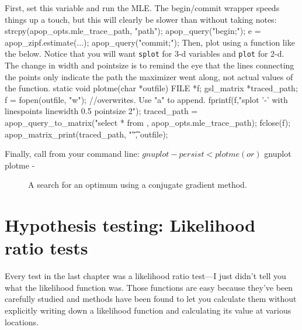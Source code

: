 First, set this variable and run the MLE. The begin/commit wrapper
speeds things up a touch, but this will clearly be slower than without
taking notes:
    strcpy(apop_opts.mle_trace_path, "path");
    apop_query("begin;");
    e   = apop_zipf.estimate(...);
    apop_query("commit;");
Then, plot using a function like the below. Notice that you will want
{\tt splot} for 3-d variables and {\tt plot} for 2-d. The change in width
and pointsize is to remind the eye that the lines connecting the points
only indicate the path the maximizer went along, not actual values of
the function.
static void plotme(char *outfile){
FILE            *f;
gsl_matrix      *traced_path;
    f       = fopen(outfile, "w");  //overwrites. Use "a" to append.
    fprintf(f,"splot '-' with linespoints linewidth 0.5 pointsize 2\n");
    traced_path = apop_query_to_matrix("select * from %
                                        , apop_opts.mle_trace_path);
    fclose(f);
    apop_matrix_print(traced_path, "\t", outfile);
}

Finally, call  from your command line:
$ gnuplot -persist < plotme
 (or)
$ gnuplot plotme -

\begin{figure}
\caption{A search for an optimum using a conjugate gradient method.}
\end{figure}

\section{Hypothesis testing: Likelihood ratio tests} Every test
in the last chapter was a likelihood ratio test---I just didn't tell
you what the likelihood function was. Those functions are easy because
they've been carefully studied and methods have been found to let you
calculate them without explicitly writing down a likelihood function
and calculating its value at various locations.

